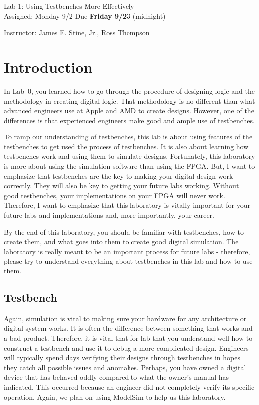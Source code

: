 \documentclass{article}
\newcommand{\myassignment}{Lab 1: Using Testbenches More Effectively}
\newcommand{\myduedate}{Assigned: Monday 9/2 Due \textbf{Friday 9/23} (midnight)}
\newcommand{\myinstructor}{Instructor: James E. Stine, Jr., Ross Thompson}
\begin{document}
\begin{center}
  {\huge \myassignment} \\
  {\large \myduedate} \\
  \begin{flushright}
  \myinstructor \\
  \end{flushright}
\end{center}

\section{Introduction}

In Lab~$0$, you learned how to go through the procedure of
designing logic and the methodology in creating digital logic.  That
methodology is no different than what advanced engineers use at Apple
and AMD to create designs.  However, one of the differences is that experienced
engineers make good and ample use of testbenches.

To ramp our understanding of testbenches, this lab is about using
features of the testbenches to get used the process of
testbenches.  It is also about learning how testbenches work and using
them to simulate designs.  Fortunately, this laboratory is more about using the
simulation software than using the FPGA.  But, I want to emphasize
that testbenches are the key to making your digital design work
correctly.  They will also
be key to getting your future labs working.  Without good
testbenches, your implementations on your FPGA will \underline{never} work.
Therefore, I want to emphasize that this laboratory is vitally important for
your future labs and implementations and, more importantly, your career.

By the end of this laboratory, you should be
familiar with testbenches, how to create them, and what goes into them
to create good digital simulation.  The laboratory is really meant to
be an important process for future labs - therefore, please
try to understand everything about testbenches in this lab and how to
use them.

\subsection{Testbench}

Again, simulation is vital to making sure your hardware for any
architecture or
digital system works.  It is often the difference between something
that works and a bad product.  Therefore, it is
vital that for lab that you understand well how to construct a
testbench and use it to debug a more complicated design.
Engineers will typically spend days verifying their designs through
testbenches in hopes they catch all possible issues and anomalies.
Perhaps, you have owned a digital device that has behaved oddly
compared to what the owner's manual has indicated.  This occurred
because an engineer did not completely verify its specific operation.
Again, we plan on using ModelSim to help us this laboratory.
\end{document}
